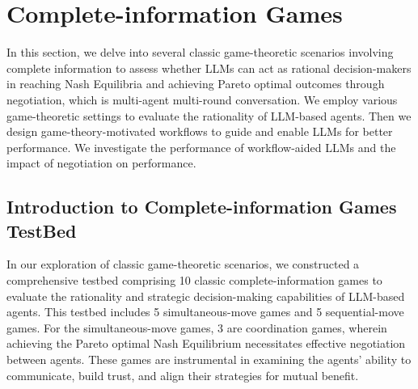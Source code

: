 \section{Complete-information Games}
\label{sec:complete}
In this section, we delve into several classic game-theoretic scenarios involving complete information to assess whether LLMs can act as rational decision-makers in reaching Nash Equilibria and achieving Pareto optimal outcomes through negotiation, which is multi-agent multi-round conversation. We employ various game-theoretic settings to evaluate the rationality of LLM-based agents. Then we design game-theory-motivated workflows to guide and enable LLMs for better performance. We investigate the performance of workflow-aided LLMs and the impact of negotiation on performance.

\subsection{Introduction to Complete-information Games TestBed}

In our exploration of classic game-theoretic scenarios, we constructed a comprehensive testbed comprising 10 classic complete-information games to evaluate the rationality and strategic decision-making capabilities of LLM-based agents. This testbed includes 5 simultaneous-move games and 5 sequential-move games. For the simultaneous-move games, 3 are coordination games, wherein achieving the Pareto optimal Nash Equilibrium necessitates effective negotiation between agents. These games are instrumental in examining the agents' ability to communicate, build trust, and align their strategies for mutual benefit. 


